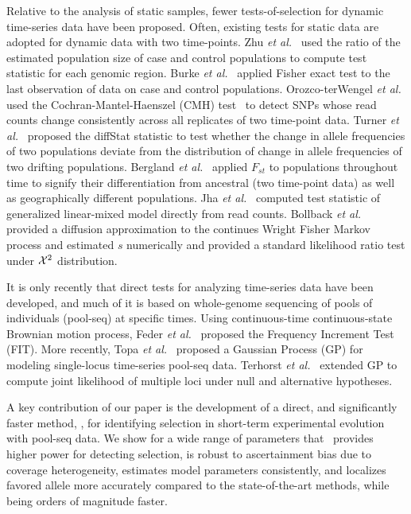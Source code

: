 Relative to the analysis of static samples, fewer tests-of-selection
for dynamic time-series data have been proposed. Often, existing tests
for static data are adopted for dynamic data with two time-points. Zhu
\emph{et al.}~\cite{zhou2011experimental} used the ratio of the estimated
population size of case and control populations to compute test
statistic for each genomic region. Burke \emph{et
 al.}~\cite{burke2010genome} applied Fisher exact test to the last
observation of data on case and control 
populations. Orozco-terWengel
\emph{et al.}~\cite{orozco2012adaptation} used the
Cochran-Mantel-Haenszel (CMH) test~\cite{agresti2011categorical} to
detect SNPs whose read counts change consistently across all
replicates of two time-point data. Turner \emph{et
 al.}~\cite{turner2011population} proposed the diffStat statistic to
test whether the change in allele frequencies of two populations
deviate from the distribution of change in allele frequencies of two
drifting populations. Bergland \emph{et
 al.}~\cite{bergland2014genomic} applied $F_{st}$ to populations
throughout time to signify their differentiation from ancestral (two
time-point data) as well as geographically different populations. Jha
\emph{et al.}~\cite{jha2015whole} computed test statistic of
generalized linear-mixed model directly from read counts. Bollback \emph{et 
al.}~\cite{bollback2008estimation} provided a diffusion approximation to
the continues Wright Fisher Markov process and estimated $s$
numerically and provided a standard likelihood ratio test under ${\cal X}^2$
distribution.

It is only recently that direct tests for analyzing time-series data
have been developed, and much of it is based on whole-genome
sequencing of pools of individuals (pool-seq) at specific times. Using
continuous-time continuous-state Brownian motion process, Feder
\emph{et al.}~\cite{feder2014Identifying} proposed the Frequency
Increment Test (FIT). More recently, Topa \emph{et
  al.}~\cite{topa2015gaussian} proposed a Gaussian Process (GP) for
modeling single-locus time-series pool-seq data. Terhorst \emph{et
  al.}~\cite{Terhorst2015Multi} extended GP to compute joint
likelihood of multiple loci under null and alternative hypotheses.

A key contribution of our paper
is the development of a direct, and significantly faster method,
\comale, for identifying selection in short-term 
experimental
evolution with pool-seq data. We show for a wide range of parameters
that \comale\ provides higher power for detecting selection, is robust
to ascertainment bias due to coverage heterogeneity, estimates model
parameters consistently, and localizes favored allele more accurately
compared to the state-of-the-art methods, while being orders of
magnitude faster.
